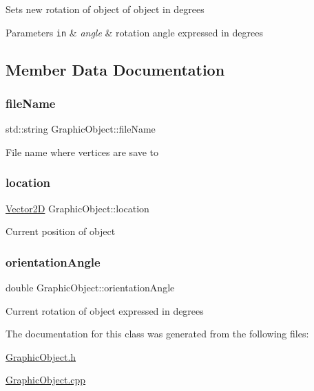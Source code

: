 Sets new rotation of object of object in degrees 
\begin{DoxyParams}[1]{Parameters}
\mbox{\tt in}  & {\em angle} & rotation angle expressed in degrees \\
\hline
\end{DoxyParams}


\subsection{Member Data Documentation}
\mbox{\label{classGraphicObject_a72b2f9c3519e13279bd59f564fea7aa0}} 
\subsubsection{\texorpdfstring{file\+Name}{fileName}}
{\footnotesize\ttfamily std\+::string Graphic\+Object\+::file\+Name\hspace{0.3cm}{\ttfamily [private]}}

File name where vertices are save to \mbox{\label{classGraphicObject_a7739828cef90b4ab696b72a3ce28d280}} 
\subsubsection{\texorpdfstring{location}{location}}
{\footnotesize\ttfamily \hyperlink{Vector2D_8h_a2a0274942d24318d2654bd0f75c54fb7}{Vector2D} Graphic\+Object\+::location\hspace{0.3cm}{\ttfamily [private]}}

Current position of object \mbox{\label{classGraphicObject_a474fc4d1f4a67b9550ba85f454068659}} 
\subsubsection{\texorpdfstring{orientation\+Angle}{orientationAngle}}
{\footnotesize\ttfamily double Graphic\+Object\+::orientation\+Angle\hspace{0.3cm}{\ttfamily [private]}}

Current rotation of object expressed in degrees 

The documentation for this class was generated from the following files\+:\begin{DoxyCompactItemize}
\item 
\hyperlink{GraphicObject_8h}{Graphic\+Object.\+h}\item 
\hyperlink{GraphicObject_8cpp}{Graphic\+Object.\+cpp}\end{DoxyCompactItemize}
